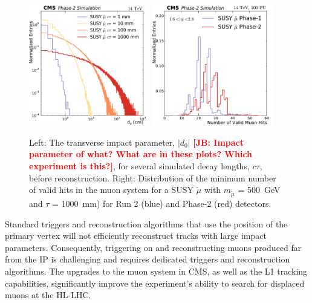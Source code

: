 \begin{figure}[t]\begin{center}
\includegraphics[width=0.47\textwidth]{figures/Stage0h1_0_d0_smuon_daughter}
\includegraphics[width=0.47\textwidth]{figures/MuonHitsEndcap}
\caption{
Left: The transverse impact parameter, $|d_{0}|$ {\bf \textcolor{red}{[JB: Impact parameter of what?  What are in these plots?  Which experiment is this?]}}, for several simulated decay lengths, $c\tau$, before reconstruction.
Right: Distribution of the minimum number of valid hits in the muon system for a SUSY $\widetilde{\mu}$ with $m_{\widetilde{\mu}}$ = 500~GeV and $\tau$ = 1000~mm) for Run 2 (blue) and Phase-2 (red) detectors. 
}
\label{fig:perfDisplaced}
\end{center}
\end{figure}

Standard triggers and reconstruction algorithms that use the position of the primary vertex will not efficiently reconstruct tracks with large impact parameters. Consequently, triggering on and reconstructing muons produced far  from the IP is challenging and requires dedicated triggers and reconstruction algorithms. The upgrades to the muon system in CMS, as well as the L1 tracking capabilities, significantly improve the experiment's ability to search for displaced muons at the HL-LHC. 

